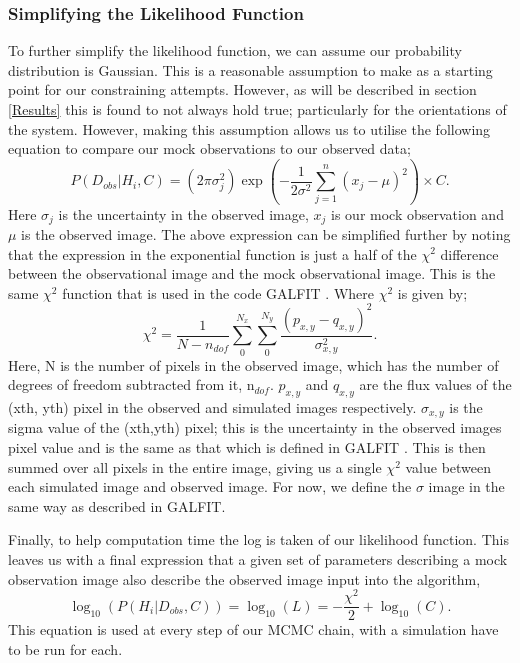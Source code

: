 \subsubsection{Simplifying the Likelihood Function}
To further simplify the likelihood function, we can assume our probability distribution is Gaussian. This is a reasonable assumption to make as a starting point for our constraining attempts. However, as will be described in section \ref{Results} this is found to not always hold true; particularly for the orientations of the system. However, making this assumption allows us to utilise the following equation to compare our mock observations to our observed data;
\begin{equation}\label{like_gauss}
    P(D_{obs}|H_{i},C) = (2\pi\sigma^{2}_{j})\exp(-\frac{1}{2\sigma^{2}}\sum_{j=1}^{n}(x_{j}-\mu)^{2}) \times C.
\end{equation}
Here $\sigma_{j}$ is the uncertainty in the observed image, $x_{j}$ is our mock observation and $\mu$ is the observed image. The above expression can be simplified further by noting that the expression in the exponential function is just a half of the $\chi^{2}$ difference between the observational image and the mock observational image. This is the same $\chi^{2}$ function that is used in the code GALFIT \citep{Peng_02}. Where $\chi^{2}$ is given by;
\begin{equation}\label{chi_squared}
    \chi^{2} = \frac{1}{N - n_{dof}}\sum_{0}^{N_{x}}\sum_{0}^{N_{y}}\frac{(p_{x,y} - q_{x,y})^{2}}{\sigma_{x,y}^{2}}.
\end{equation}
Here, N is the number of pixels in the observed image, which has the number of degrees of freedom subtracted from it, n$_{dof}$. $p_{x,y}$ and $q_{x,y}$ are the flux values of the (xth, yth) pixel in the observed and simulated images respectively. $\sigma_{x,y}$ is the sigma value of the (xth,yth) pixel; this is the uncertainty in the observed images pixel value and is the same as that which is defined in GALFIT \citep{Peng_02,2010AJ....139.2097P}. This is then summed over all pixels in the entire image, giving us a single $\chi^{2}$ value between each simulated image and observed image. For now, we define the $\sigma$ image in the same way as described in GALFIT.

Finally, to help computation time the log is taken of our likelihood function. This leaves us with a final expression that a given set of parameters describing a mock observation image also describe the observed image input into the algorithm,
\begin{equation}\label{likelihood}
    \log_{10}(P(H_{i}|D_{obs},C)) = \log_{10}(L) = - \frac{\chi^{2}}{2} + \log_{10}(C).
\end{equation}
This equation is used at every step of our MCMC chain, with a simulation have to be run for each.


